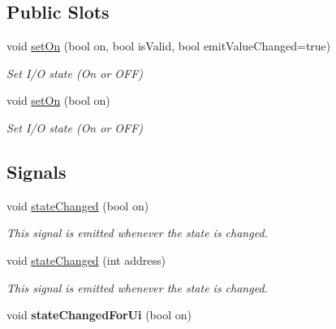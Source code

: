 \subsection*{Public Slots}
\begin{DoxyCompactItemize}
\item 
void \hyperlink{classmdt_digital_io_a8feb155c430f67589ba776b7b03758d9}{setOn} (bool on, bool isValid, bool emitValueChanged=true)
\begin{DoxyCompactList}\small\item\em Set I/O state (On or OFF) \end{DoxyCompactList}\item 
void \hyperlink{classmdt_digital_io_a88308968532c1e23f695c43a62a3be40}{setOn} (bool on)
\begin{DoxyCompactList}\small\item\em Set I/O state (On or OFF) \end{DoxyCompactList}\end{DoxyCompactItemize}
\subsection*{Signals}
\begin{DoxyCompactItemize}
\item 
\hypertarget{classmdt_digital_io_a69c20119906682c0bd90833598127328}{
void \hyperlink{classmdt_digital_io_a69c20119906682c0bd90833598127328}{stateChanged} (bool on)}
\label{classmdt_digital_io_a69c20119906682c0bd90833598127328}

\begin{DoxyCompactList}\small\item\em This signal is emitted whenever the state is changed. \end{DoxyCompactList}\item 
void \hyperlink{classmdt_digital_io_aa23bf21e08f0b0d82e430e88ac03aba8}{stateChanged} (int address)
\begin{DoxyCompactList}\small\item\em This signal is emitted whenever the state is changed. \end{DoxyCompactList}\item 
\hypertarget{classmdt_digital_io_ab50657b37b4915bd142aa0f22f45fd41}{
void {\bfseries stateChangedForUi} (bool on)}
\label{classmdt_digital_io_ab50657b37b4915bd142aa0f22f45fd41}

\end{DoxyCompactItemize}
